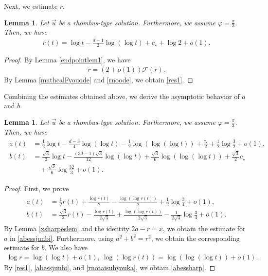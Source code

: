 \documentclass[10pt,a4paper]{amsart}
\newtheorem{lemma}[theorem]{Lemma}
\numberwithin{equation}{section}
\begin{document}
Next, we estimate $r$.



\begin{lemma}\label{reslem}
Let $\vec{u}$ be a rhombus-type solution. Furthermore, we assume $\varphi=\frac{\pi}{3}$. Then, we have
\begin{align}\label{res1}
r(t)=\log{t}-\frac{d-1}{2}\log{(\log{t})}+c_{\star}+\log{2}+o(1).
\end{align}
\end{lemma}
\begin{proof}
By Lemma \ref{endpointlem1}, we have
\begin{align}\label{rnoode}
\dot{r}=\left(2+o(1)\right)\mathcal{F}(r).
\end{align}
By Lemma \ref{mathcalFyouode} and \eqref{rnoode}, we obtain \eqref{res1}.
\end{proof}


Combining the estimates obtained above, we derive the asymptotic behavior of $a$ and $b$.

\begin{lemma}\label{abes}
Let $\vec{u}$ be a rhombus-type solution. Furthermore, we assume $\varphi=\frac{\pi}{3}$. Then, we have
\begin{align}\label{abessharp}
\begin{aligned}
a(t)&=\frac{1}{2}\log{t}-\frac{d-3}{4}\log{(\log{t})}-\frac{1}{2}\log{(\log{(\log{t})})}+\frac{c_{\star}}{2}+\frac{1}{2}\log{\frac{3}{2}}+o(1),
\\
b(t)&=\frac{\sqrt{3}}{2}\log{t}-\frac{(3d-1)\sqrt{3}}{12}\log{(\log{t})}+\frac{\sqrt{3}}{6}\log{(\log{(\log{t})})}+\frac{\sqrt{3}}{2}c_{\star}
\\
&\quad+\frac{\sqrt{3}}{6}\log{\frac{32}{3}}+o(1).
\end{aligned}
\end{align}
\end{lemma}
\begin{proof}
First, we prove
\begin{align}\label{abessjunbi}
\begin{aligned}
a(t)&=\frac{1}{2}r(t)+\frac{\log{r(t)}}{2}-\frac{\log{(\log{r(t)})}}{2}+\frac{1}{2}\log{\frac{3}{4}}+o(1),
\\
b(t)&=\frac{\sqrt{3}}{2}r(t)-\frac{\log{r(t)}}{2\sqrt{3}}+\frac{\log{(\log{r(t)})}}{2\sqrt{3}}-\frac{1}{2\sqrt{3}}\log{\frac{3}{4}}+o(1).
\end{aligned}
\end{align}
By Lemma \ref{xsharpeslem} and the identity $2a-r=x$, we obtain the estimate for $a$ in \eqref{abessjunbi}. Furthermore, using $a^2+b^2=r^2$, we obtain the corresponding estimate for $b$. We also have
\begin{align}\label{rnotaisuhyouka}
\log{r}=\log{(\log{t})}+o(1),\ \log{(\log{r(t)})}=\log{(\log{(\log{t})})}+o(1).
\end{align}
By \eqref{res1}, \eqref{abessjunbi}, and \eqref{rnotaisuhyouka}, we obtain \eqref{abessharp}.

\end{proof}
\end{document}
